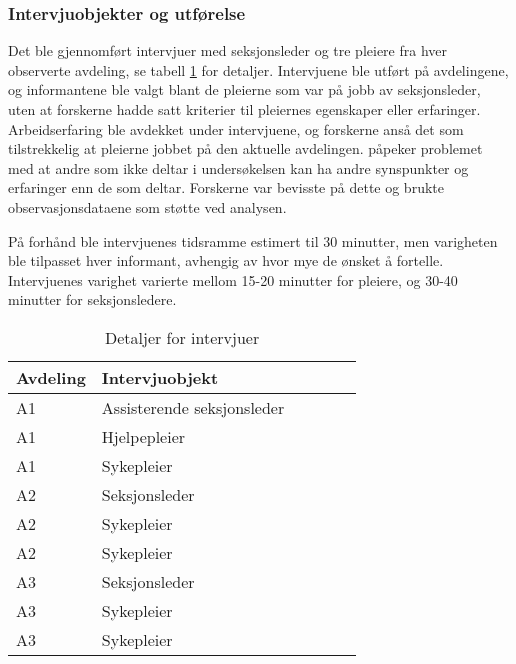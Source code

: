 \subsubsection{Intervjuobjekter og utførelse}
Det ble gjennomført intervjuer med seksjonsleder og tre pleiere fra hver observerte avdeling, se tabell \ref{intervjudetaljer} for detaljer. Intervjuene ble utført på avdelingene, og informantene ble valgt blant de pleierne som var på jobb av seksjonsleder, uten at forskerne hadde satt kriterier til pleiernes egenskaper eller erfaringer. Arbeidserfaring ble avdekket under intervjuene, og forskerne anså det som tilstrekkelig at pleierne jobbet på den aktuelle avdelingen. \citet{Tjora} påpeker problemet med at andre som ikke deltar i undersøkelsen kan ha andre synspunkter og erfaringer enn de som deltar. Forskerne var bevisste på dette og brukte observasjonsdataene som støtte ved analysen.
 
\noindent
På forhånd ble intervjuenes tidsramme estimert til 30 minutter, men varigheten ble tilpasset hver informant, avhengig av hvor mye de ønsket å fortelle. Intervjuenes varighet varierte mellom 15-20 minutter for pleiere, og 30-40 minutter for seksjonsledere.
 
\begin{table}[H]\centering
    \begin{tabular}{ |l|l|l|l|l|l| }
    \hline
    \textbf{Avdeling} & \textbf{Intervjuobjekt} \\ \hline
       A1 & Assisterende seksjonsleder \\ \hline
       A1 & Hjelpepleier \\ \hline
       A1 & Sykepleier \\ \hline
       A2 & Seksjonsleder \\ \hline
       A2 & Sykepleier \\ \hline
       A2 & Sykepleier \\ \hline
       A3 & Seksjonsleder \\ \hline
       A3 & Sykepleier \\ \hline
       A3 & Sykepleier \\ \hline
    \end{tabular}
    \caption {Detaljer for intervjuer}
    \label{intervjudetaljer}
\end{table}
